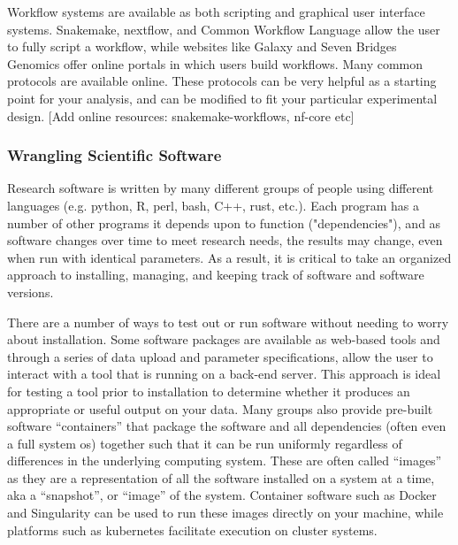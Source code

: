 \documentclass[10pt,letterpaper]{article}
\begin{document}
Workflow systems are available as both scripting and graphical user interface systems. 
Snakemake, nextflow, and Common Workflow Language allow the user to fully script a workflow, while websites like Galaxy and Seven Bridges Genomics offer online portals in which users build workflows. 
Many common protocols are available online. 
These protocols can be very helpful as a starting point for your analysis, and can be modified to fit your particular experimental design. 
[Add online resources: snakemake-workflows, nf-core etc] %


\subsubsection*{Wrangling Scientific Software} 
Research software is written by many different groups of people using different languages (e.g. python, R, perl, bash, C++, rust, etc.). 
Each program has a number of other programs it depends upon to function ("dependencies"), and as software changes over time to meet research needs, the results may change, even when run with identical parameters. 
As a result, it is critical to take an organized approach to installing, managing, and keeping track of software and software versions. 

There are a number of ways to test out or run software without needing to worry about installation. 
Some software packages are available as web-based tools and through a series of data upload and parameter specifications, allow the user to interact with a tool that is running on a back-end server. 
This approach is ideal for testing a tool prior to installation to determine whether it produces an appropriate or useful output on your data. 
Many groups also provide pre-built software “containers” that package the software and all dependencies (often even a full system os) together such that it can be run uniformly regardless of differences in the underlying computing system. 
These are often called “images” as they are a representation of all the software installed on a system at a time, aka a “snapshot”, or “image” of the system. 
Container software such as Docker and Singularity can be used to run these images directly on your machine, while platforms such as kubernetes facilitate execution on cluster systems.
\end{document}
